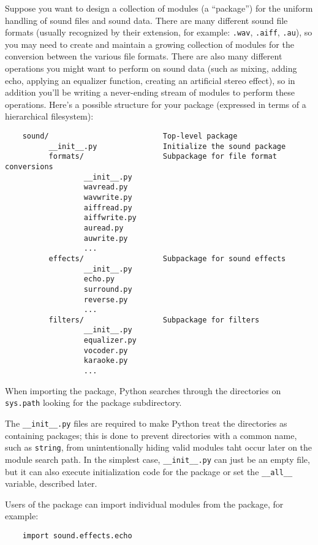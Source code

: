 \documentclass[UTF8]{article}
\begin{document}
Suppose you want to design a collection of modules (a ``package'') for the uniform handling of
sound files and sound data. There are many different sound file formats (usually recognized by
their extension, for example: \texttt{.wav}, \texttt{.aiff}, \texttt{.au}), so you may need to
create and maintain a growing collection of modules for the conversion between the various file
formats. There are also many different operations you might want to perform on sound data (such
as mixing, adding echo, applying an equalizer function, creating an artificial stereo effect), so
in addition you'll be writing a never-ending stream of modules to perform these operations. Here's
a possible structure for your package (expressed in terms of a hierarchical filesystem):
\begin{verbatim}
    sound/                          Top-level package
          __init__.py               Initialize the sound package
          formats/                  Subpackage for file format conversions
                  __init__.py
                  wavread.py
                  wavwrite.py
                  aiffread.py
                  aiffwrite.py
                  auread.py
                  auwrite.py
                  ...
          effects/                  Subpackage for sound effects
                  __init__.py
                  echo.py
                  surround.py
                  reverse.py
                  ...
          filters/                  Subpackage for filters
                  __init__.py
                  equalizer.py
                  vocoder.py
                  karaoke.py
                  ...
\end{verbatim}

When importing the package, Python searches through the directories on \texttt{sys.path} looking
for the package subdirectory.

The \texttt{\_\_init\_\_.py} files are required to make Python treat the directories as containing
packages; this is done to prevent directories with a common name, such as \texttt{string}, from
unintentionally hiding valid modules taht occur later on the module search path. In the simplest
case, \texttt{\_\_init\_\_.py} can just be an empty file, but it can also execute initialization
code for the package or set the \texttt{\_\_all\_\_} variable, described later.

Users of the package can import individual modules from the package, for example:
\begin{verbatim}
    import sound.effects.echo
\end{verbatim}
\end{document}
